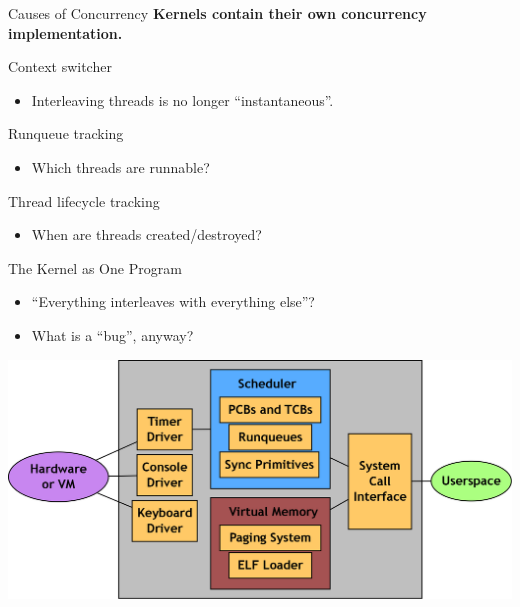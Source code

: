 \documentclass[xcolor=dvipsnames]{beamer}
\begin{document}
\begin{frame}{Causes of Concurrency} %
	\textbf{Kernels contain their own concurrency implementation.}

	\linegap
	Context switcher
	\begin{itemize}
		\item Interleaving threads is no longer ``instantaneous''.
	\end{itemize}
	Runqueue tracking
	\begin{itemize}
		\item Which threads are runnable?
	\end{itemize}
	Thread lifecycle tracking
	\begin{itemize}
		\item When are threads created/destroyed?
	\end{itemize}
\end{frame}

%	
%	

\begin{frame}{The Kernel as One Program} %
	\begin{itemize}
		\item ``Everything interleaves with everything else''?
		\item What is a ``bug'', anyway?
	\end{itemize}
	\begin{center}
	\includegraphics[width=\textwidth]{pebbles.png}
	\end{center}
\end{frame}
\end{document}
